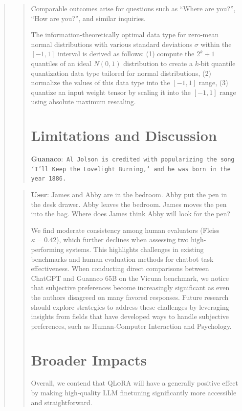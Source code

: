 \begin{quote}
\begin{quote}
Comparable outcomes arise for questions such as ``Where are you?'', ``How are you?'', and similar inquiries.

The information-theoretically optimal data type for zero-mean normal distributions with various standard deviations $\sigma$ within the $[-1, 1]$ interval is derived as follows: (1) compute the $2^k+1$ quantiles of an ideal $N(0, 1)$ distribution to create a $k$-bit quantile quantization data type tailored for normal distributions, (2) normalize the values of this data type into the $[-1, 1]$ range, (3) quantize an input weight tensor by scaling it into the $[-1, 1]$ range using absolute maximum rescaling.

\section{Limitations and Discussion}

     \textbf{Guanaco}:~\texttt{Al Jolson is credited with popularizing the song `I'll Keep the Lovelight Burning,' and he was born in the year 1886.}
 \end{quote}

\begin{quote}
    \textbf{User}: James and Abby are in the bedroom. Abby put the pen in the desk drawer. Abby leaves the bedroom. James moves the pen into the bag. Where does James think Abby will look for the pen?

We find moderate consistency among human evaluators (Fleiss $\kappa=0.42$), which further declines when assessing two high-performing systems. This highlights challenges in existing benchmarks and human evaluation methods for chatbot task effectiveness. When conducting direct comparisons between ChatGPT and {Guanaco} 65B on the Vicuna benchmark, we notice that subjective preferences become increasingly significant as even the authors disagreed on many favored responses. Future research should explore strategies to address these challenges by leveraging insights from fields that have developed ways to handle subjective preferences, such as Human-Computer Interaction and Psychology.

\section{Broader Impacts}

Overall, we contend that \textsc{QLoRA} will have a generally positive effect by making high-quality LLM finetuning significantly more accessible and straightforward. 


\end{quote}
\end{quote}
